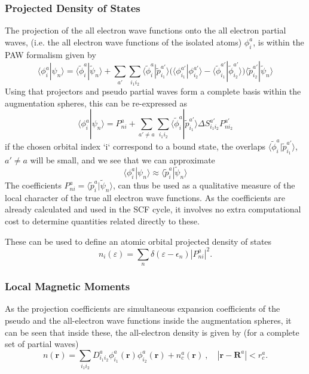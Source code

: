 \documentclass[a4paper]{article}
\newcommand{\s}[1]{\tilde{#1}}
\newcommand{\br}{\mathbf{r}}
\newcommand{\bR}{\mathbf{R}}
\newcommand{\braket}[2]{\langle #1 | #2 \rangle}
\begin{document}
\subsubsection{Projected Density of States}
The projection of the all electron wave functions onto the all
electron partial waves, (i.e. the all electron wave functions of the
isolated atoms) $\phi_i^a$, is within the PAW formalism given by
%
\begin{equation}
  \langle \phi^a_i | \psi_n\rangle = \langle \tilde \phi^a_i | \tilde \psi_n \rangle + \sum_{a'} \sum_{i_1i_2} \langle \tilde \phi^a_i | \tilde p_{i_1}^{a'} \rangle \Big(\langle \phi_{i_1}^{a'} | \phi_{i_2}^{a'} \rangle - \langle \tilde \phi_{i_1}^{a'} | \tilde  \phi_{i_2}^{a'}\rangle \Big)\langle \tilde p^{a'}_{i_2} | \tilde  \psi_n \rangle
\end{equation}
%
Using that projectors and pseudo partial waves form a complete basis
within the augmentation spheres, this can be re-expressed as
%
\begin{equation}
  \langle \phi^a_i | \psi_n \rangle = P^a_{ni} + \sum_{a' \neq a} \sum_{i_1i_2} \langle \tilde \phi^a_i | \tilde p^{a'}_{i_1} \rangle \Delta S^{a'}_{i_1i_2} P^{a'}_{ni_2}
\end{equation}
%
if the chosen orbital index `i` correspond to a bound state, the
overlaps $\langle \tilde \phi^a_i | \tilde p^{a'}_{i_1} \rangle$,
$a'\neq a$ will be small, and we see that we can approximate
%
\begin{equation}
  \langle \phi^a_i | \psi_n \rangle \approx \langle \tilde p_i^a | \tilde \psi_n \rangle
\end{equation}
%
The coefficients $P_{ni}^a = \braket{\s{p}_i^a}{\s{\psi}_n}$, can thus
be used as a qualitative measure of the local character of the true
all electron wave functions. As the coefficients are already
calculated and used in the SCF cycle, it involves no extra
computational cost to determine quantities related directly to these.

These can be used to define an atomic orbital projected density of states
%
\begin{equation}
  n_i(\varepsilon) = \sum_n \delta(\varepsilon - \epsilon_n) \left|P^a_{ni}\right|^2.
\end{equation}
%

\subsubsection{Local Magnetic Moments}
As the projection coefficients are simultaneous expansion coefficients
of the pseudo and the all-electron wave functions inside the
augmentation spheres, it can be seen that inside these, the
all-electron density is given by (for a complete set of partial waves)
\begin{equation}
  \label{eq:atom_density}
  n(\br) = \sum_{i_1i_2} D_{i_1i_2}^a \phi_{i_1}^a(\br)\phi_{i_2}^a(\br) + n_c^a(\br)~, \quad |\br - \bR^a| < r_c^a.
\end{equation}
\end{document}
